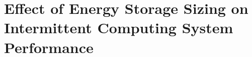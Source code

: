 \chapter{Effect of Energy Storage Sizing on Intermittent Computing System Performance}
\label{Chapter:sizingeffect}






